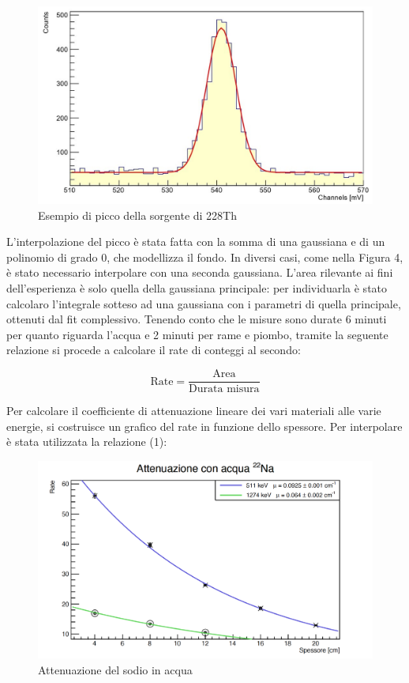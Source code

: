 \documentclass[a4paper,10pt]{article}
\begin{document}
\begin{figure}[!h]
    \centering
    \includegraphics[scale=0.6]{grafici/piccotorio}
    \caption{Esempio di picco della sorgente di 228Th}
\end{figure}

\noindent L'interpolazione del picco \`e stata fatta con la somma di una gaussiana e di un polinomio di grado 0, che modellizza il fondo. In diversi casi, come nella Figura 4, \`e stato necessario interpolare con una seconda gaussiana. L'area rilevante ai fini dell'esperienza \`e solo quella della gaussiana principale: per individuarla \`e stato calcolaro l'integrale sotteso ad una gaussiana con i parametri di quella principale, ottenuti dal fit complessivo. Tenendo conto che le misure sono durate 6 minuti per quanto riguarda l'acqua e 2 minuti per rame e piombo, tramite la seguente relazione si procede a calcolare il rate di conteggi al secondo:

\begin{equation}
	\textrm{Rate} = \frac{\textrm{Area}}{\textrm{Durata  misura}}
\end{equation}

\noindent Per calcolare il coefficiente di attenuazione lineare dei vari materiali alle varie energie, si costruisce un grafico del rate in funzione dello spessore. Per interpolare è stata utilizzata la relazione (1):

\begin{figure}[H]
    \centering
    \includegraphics[scale=0.45]{grafici/attenuazionesodioacqua}
    \caption{Attenuazione del sodio in acqua}
\end{figure}
\end{document}
